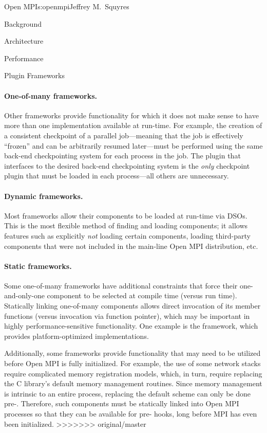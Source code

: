 \begin{aosachapter}{Open MPI}{s:openmpi}{Jeffrey M.\ Squyres}
\begin{aosasect1}{Background}
\begin{aosasect1}{Architecture}
\begin{aosasect2}{Performance}
\begin{aosasect2}{Plugin Frameworks}

\paragraph{One-of-many frameworks.} 

Other frameworks provide functionality for which it does not make sense to
have more than one implementation available at run-time.
%
For example, the creation of a consistent checkpoint of a parallel 
job---meaning that the job is effectively ``frozen'' and can be arbitrarily
resumed later---must be performed using the same back-end
checkpointing system for each process in the job.
%
The plugin that interfaces to the desired back-end checkpointing
system is the \emph{only} checkpoint plugin that must be loaded in each
process---all others are unnecessary.


\paragraph{Dynamic frameworks.} 

Most frameworks allow their components to be loaded at run-time via
DSOs.  This is the most flexible method of finding and loading
components; it allows features such as explicitly \emph{not} loading
certain components, loading third-party components that were not
included in the main-line Open MPI distribution, etc.


\paragraph{Static frameworks.} 

Some one-of-many frameworks have additional constraints that force
their one-and-only-one component to be selected at compile time (versus
run time).  Statically linking one-of-many components allows direct
invocation of its member functions (versus invocation via function
pointer), which may be important in highly performance-sensitive
functionality.  One example is the  framework, which
provides platform-optimized  implementations.

Additionally, some frameworks provide functionality that may need to
be utilized before Open MPI is fully initialized.  
%
For example, the use of some network stacks require complicated memory
registration models, which, in turn, require replacing the C library's
default memory management routines.
%
Since memory management is intrinsic to an entire process, replacing
the default scheme can only be done pre-.
%
Therefore, such components must be statically linked into Open MPI
processes so that they can be available for pre- hooks, long
before MPI has even been initialized.
>>>>>>> original/master


\end{aosasect2}
\end{aosasect2}
\end{aosasect1}
\end{aosasect1}
\end{aosachapter}
